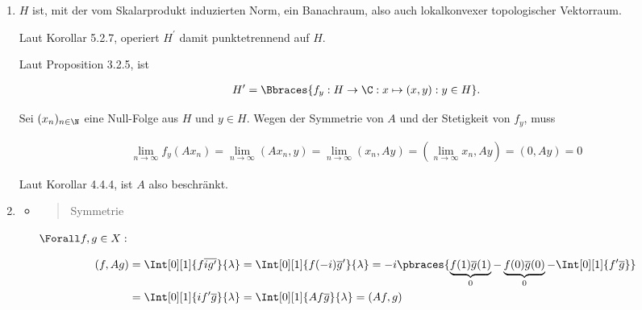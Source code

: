 \begin{solution}

\phantom{}

\begin{enumerate}

  \item
  $H$ ist, mit der vom Skalarprodukt induzierten Norm, ein Banachraum, also auch lokalkonvexer topologischer Vektorraum.


  Laut Korollar 5.2.7, operiert $H^\prime$ damit punktetrennend auf $H$.


  Laut Proposition 3.2.5, ist

  \begin{align*}
    H^\prime
    =
    \Bbraces
    {
      f_y:
      H \to \C:
      x \mapsto (x, y):
      y \in H
    }.
  \end{align*}

  Sei $(x_n)_{n \in \N}$ eine Null-Folge aus $H$ und $y \in H$.
  Wegen der Symmetrie von $A$ und der Stetigkeit von $f_y$, muss

  \begin{align*}
    \lim_{n \to \infty} f_y(A x_n)
    =
    \lim_{n \to \infty} (A x_n, y)
    =
    \lim_{n \to \infty} (x_n, A y)
    =
    (\lim_{n \to \infty} x_n, A y)
    =
    (0, A y) = 0
  \end{align*}


  Laut Korollar 4.4.4, ist $A$ also beschränkt.

  \item
  \begin{itemize}

    \item
    \blockquote{Symmetrie}:
    $\Forall f, g \in X:$

    \begin{align*}
      (f, A g)
      & =
      \Int[0][1]{f \overline{i g^\prime}}{\lambda}
      =
      \Int[0][1]{f (-i) \overline{g}^\prime}{\lambda}
      =
      -i \pbraces
      {
        \underbrace{f(1) \overline{g}(1)}_0 -
        \underbrace{f(0) \overline{g}(0)}_0 -
        \Int[0][1]{f^\prime \overline{g}}
      } \\
      & =
      \Int[0][1]{i f^\prime \overline{g}}{\lambda}
      =
      \Int[0][1]{A f \overline{g}}{\lambda}
      =
      (A f, g)
    \end{align*}


\end{itemize}
\end{enumerate}
\end{solution}
